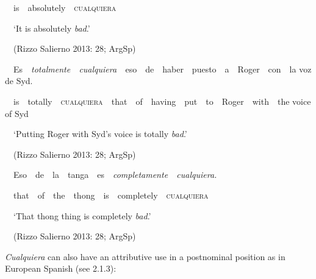 \begin{styleStandard}
\ \ is\ \ absolutely\ \ \textsc{cualquiera}\ \ 
\end{styleStandard}

\begin{styleStandard}
\ \ ‘It is absolutely \textit{bad}.’
\end{styleStandard}

\begin{styleStandard}
\ \ (Rizzo Salierno 2013: 28; ArgSp)
\end{styleStandard}

\begin{styleStandard}
\ \ Es\ \ \textit{totalmente\ \ cualquiera\ \ }eso\ \ de\ \ haber\ \ puesto\ \ a\ \ Roger\ \ con\ \ la voz de Syd.
\end{styleStandard}

\begin{styleStandard}
\ \ is\ \ totally\ \ \textsc{cualquiera}\textit{\ \ }that\ \ of\ \ having\ \ put\ \ to\ \ Roger\ \ with\ \ the voice of Syd
\end{styleStandard}

\begin{styleStandard}
\ \ ‘Putting Roger with Syd’s voice is totally \textit{bad}.’
\end{styleStandard}

\begin{styleStandard}
\ \ (Rizzo Salierno 2013: 28; ArgSp)
\end{styleStandard}

\begin{styleStandard}
\ \ Eso\ \ de\ \ la\ \ tanga\ \ es\ \ \textit{completamente\ \ cualquiera.}
\end{styleStandard}

\begin{styleStandard}
\ \ that\ \ of\ \ the\ \ thong\ \ is\ \ completely\ \ \textsc{cualquiera}
\end{styleStandard}

\begin{styleStandard}
\ \ ‘That thong thing is completely \textit{bad}.’
\end{styleStandard}

\begin{styleStandard}
\ \ (Rizzo Salierno 2013: 28; ArgSp)
\end{styleStandard}

\begin{styleStandard}
\textit{Cualquiera} can also have an attributive use in a postnominal position as in European Spanish (see 2.1.3):
\end{styleStandard}

